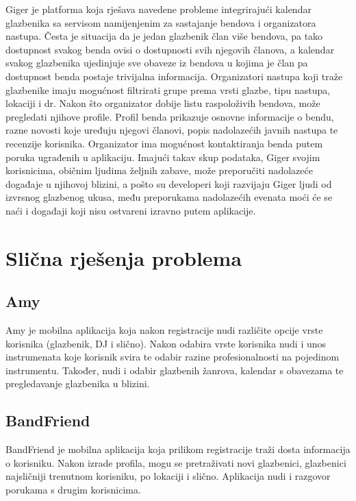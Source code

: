 		Giger je platforma koja rješava navedene probleme integrirajući kalendar glazbenika sa servisom namijenjenim za sastajanje bendova i organizatora nastupa. Česta je situacija da je jedan glazbenik član više bendova, pa tako dostupnost svakog benda ovisi o dostupnosti svih njegovih članova, a kalendar svakog glazbenika ujedinjuje sve obaveze iz bendova u kojima je član pa dostupnost benda postaje trivijalna informacija. Organizatori nastupa koji traže glazbenike imaju mogućnost filtrirati grupe prema vrsti glazbe, tipu nastupa, lokaciji i dr. Nakon što organizator dobije listu raspoloživih bendova, može pregledati njihove profile. Profil benda prikazuje osnovne informacije o bendu, razne novosti koje uređuju njegovi članovi, popis nadolazećih javnih nastupa te recenzije korisnika. Organizator ima mogućnost kontaktiranja benda putem poruka ugrađenih u aplikaciju. Imajući takav skup podataka, Giger svojim korisnicima, običnim ljudima željnih zabave, može preporučiti nadolazeće događaje u njihovoj blizini, a pošto su developeri koji razvijaju Giger ljudi od izvrsnog glazbenog ukusa, među preporukama nadolazećih evenata moći će se naći i događaji koji nisu ostvareni izravno putem aplikacije.
		
		\section{Slična rješenja problema}
		
		\subsection{Amy}
		
		Amy je mobilna aplikacija koja nakon registracije nudi različite opcije vrste korisnika (glazbenik, DJ i slično). Nakon odabira vrste korisnika nudi i unos instrumenata koje korisnik svira te odabir razine profesionalnosti na pojedinom instrumentu. Također, nudi i odabir glazbenih žanrova, kalendar s obavezama te pregledavanje glazbenika u blizini.  
		
		
	    \subsection{BandFriend}
		
		BandFriend je mobilna aplikacija koja prilikom registracije traži dosta informacija o korisniku. Nakon izrade profila, mogu se pretraživati novi glazbenici, glazbenici najsličniji trenutnom korisniku, po lokaciji i slično. Aplikacija nudi i razgovor porukama s drugim korisnicima.
